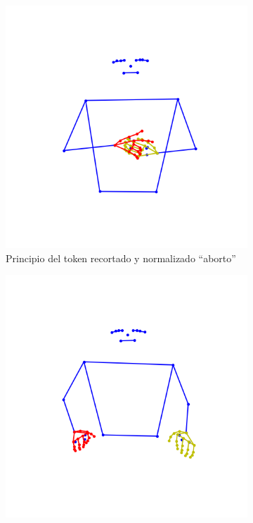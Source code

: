 \begin{figure}[t]
\centering
		\begin{subfigure}[t]{0.3\textwidth}
		\centering
		\includegraphics[align=t,width=0.9\linewidth, height =0.9\linewidth]{Graphics/cropped_principio_aborto.png}
		\caption{Principio del token recortado y normalizado ``aborto''}
		\label{f:principio_novariable_aborto}
	\end{subfigure}
		\begin{subfigure}[t]{0.3\textwidth}
		\centering
		\includegraphics[align=t,width=0.9\linewidth, height =0.9\linewidth]{Graphics/cropped_principio_amar.png}

\end{subfigure}
\end{figure}
